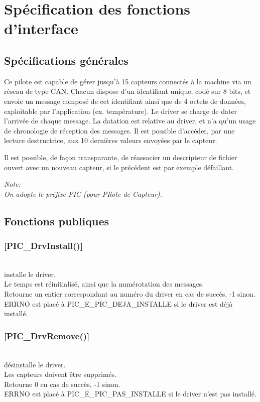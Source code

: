 

\section{Spécification des fonctions d'interface}

\subsection{Spécifications générales}

Ce pilote est capable de gérer jusqu'à 15 capteurs connectés à la 
machine via un réseau de type CAN. Chacun dispose d'un identifiant
unique, codé sur 8 bits, et envoie un message composé de cet
identifiant ainsi que de 4 octets de données, exploitable par
l'application (ex. température).
Le driver se charge de dater l'arrivée de chaque message.
La datation est relative au driver, et n'a qu'un usage
de chronologie de réception des messages.
Il est possible d'accéder, par une lecture destructrice, aux
10 dernières valeurs envoyées par le capteur.

Il est possible, de façon transparante, de réassocier un descripteur
de fichier ouvert avec un nouveau capteur, si le précédent est 
par exemple défaillant.

\textsl{
Note:\\
On adopte le préfixe PIC (pour PIlote de Capteur).
}


\subsection{Fonctions publiques}


 \subsubsection{[PIC\_DrvInstall()]} \hfill\\
installe le driver.\\
Le temps est réinitialisé, ainsi que la numérotation des messages.\\
Retourne un entier correspondant au numéro du driver
 en cas de succès, -1 sinon.\\
ERRNO est placé à PIC\_E\_PIC\_DEJA\_INSTALLE si le driver est déjà 
installé.

 \subsubsection{[PIC\_DrvRemove()]} \hfill\\
désinstalle le driver.\\
Les capteurs doivent être supprimés.\\
Retourne 0 en cas de succès, -1 sinon.\\
ERRNO est placé à PIC\_E\_PIC\_PAS\_INSTALLE si le driver n'est pas 
installé.

